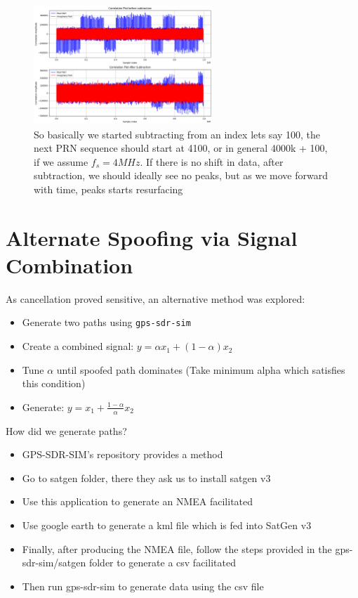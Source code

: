 \documentclass[12pt]{report}
\begin{document}
\begin{figure}[H]
  \centering
  \includegraphics[width=0.6\textwidth]{misalign.png}
  \caption{So basically we started subtracting from an index lets say 100, the next PRN sequence should start at 4100, or in general 4000k + 100, if we assume $f_s = 4MHz$. If there is no shift in data, after subtraction, we should ideally see no peaks, but as we move forward with time, peaks starts resurfacing}
  \label{fig:misalign}
\end{figure}
\section{Alternate Spoofing via Signal Combination}
As cancellation proved sensitive, an alternative method was explored:
\begin{itemize}
  \item Generate two paths using \texttt{gps-sdr-sim}
  \item Create a combined signal: \( y = \alpha x_1 + (1-\alpha)x_2 \)
  \item Tune $\alpha$ until spoofed path dominates (Take minimum alpha which satisfies this condition)
  \item Generate: \( y = x_1 + \frac{1-\alpha}{\alpha}x_2 \)
\end{itemize}

\noindent How did we generate paths?
\begin{itemize}
  \item GPS-SDR-SIM's repository provides a method
  \item Go to satgen folder, there they ask us to install satgen v3
  \item Use this application to generate an NMEA facilitated
  \item Use google earth to generate a kml file which is fed into SatGen v3
  \item Finally, after producing the NMEA file, follow the steps provided in the gps-sdr-sim/satgen folder to generate a csv facilitated
  \item Then run gps-sdr-sim to generate data using the csv file
\end{itemize}
\end{document}
